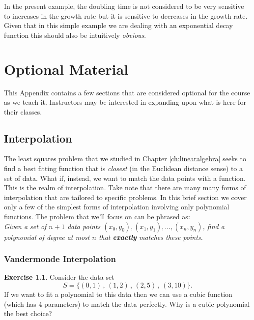 \documentclass[
]{book}
\theoremstyle{definition}
\theoremstyle{definition}
\theoremstyle{definition}
\newtheorem{exercise}{Exercise}[chapter]
\theoremstyle{remark}
\begin{document}
In the present example, the doubling time is not considered to be very
sensitive to increases in the growth rate but it is sensitive to
decreases in the growth rate. Given that in this simple example we are
dealing with an exponential decay function this should also be
intuitively \emph{obvious}.

\hypertarget{ch:extras}{%
\chapter{Optional Material}\label{ch:extras}}

This Appendix contains a few sections that are considered optional for
the course as we teach it. Instructors may be interested
in expanding upon what is here for their classes.

\hypertarget{interpolation}{%
\section{Interpolation}\label{interpolation}}

The least squares problem that we studied in Chapter \ref{ch:linearalgebra} seeks to find a best fitting function that is \emph{closest} (in the Euclidean distance sense) to a set of data. What if, instead, we want to match the data points with a function. This is the realm of interpolation. Take note that there are many many forms of interpolation that are tailored to specific problems. In this brief section we cover only a few of the simplest forms of interpolation involving only polynomial functions. The problem that we'll focus on can be phrased as:\\
\emph{Given a set of \(n+1\) data points \((x_0, y_0), (x_1, y_1), \ldots, (x_n,y_n)\), find a polynomial of degree at most \(n\) that \textbf{exactly} matches these points.}

\hypertarget{vandermonde-interpolation}{%
\subsection{Vandermonde Interpolation}\label{vandermonde-interpolation}}

\begin{exercise}
\protect\hypertarget{exr:unnamed-chunk-838}{}{\label{exr:unnamed-chunk-838} }Consider the data set
\[S = \{ (0,1) \, , \, (1,2) \, , \, (2,5) \, , \, (3,10) \}.\]
If we want to fit a polynomial to this data then we can use a cubic function (which has 4
parameters) to match the data perfectly. Why is a cubic polynomial the best choice?
\end{exercise}
\end{document}
